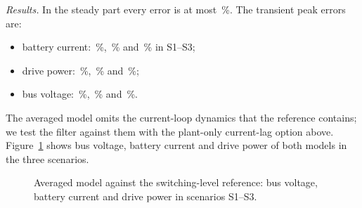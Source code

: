 \emph{Results.} In the steady part every error is at most \,\%. The transient peak errors are:
\begin{itemize}
\item battery current: \,\%, \,\% and \,\% in S1--S3;
\item drive power: \,\%, \,\% and \,\%;
\item bus voltage: \,\%, \,\% and \,\%.
\end{itemize}
The averaged model omits the current-loop dynamics that the reference contains; we test the filter against them with the plant-only current-lag option above. Figure~\ref{fig:val} shows bus voltage, battery current and drive power of both models in the three scenarios.
\begin{figure}[tbp]\centering{}\caption{Averaged model against the switching-level reference: bus voltage, battery current and drive power in scenarios S1--S3.}\label{fig:val}\end{figure}
